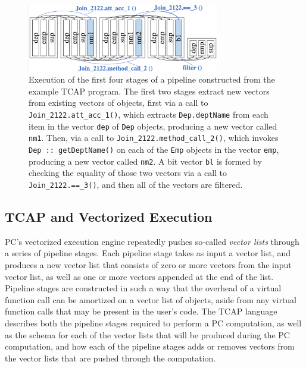 \begin{figure}
  \begin{center}
    \includegraphics[width=3.3in]{TCAP}
  \end{center}
  \caption{Execution of the first four stages of a pipeline constructed from the example TCAP program.  The first two stages extract new vectors from 
existing vectors of objects, first via a call to
\texttt{Join\_2122.att\_acc\_1()}, which extracts
\texttt{Dep.deptName} from each item in the vector \texttt{dep}
of \texttt{Dep} objects, producing a new vector called \texttt{nm1}. Then,
via a call to \texttt{Join\_2122.method\_call\_2()}, which invokes \texttt{Dep :: getDeptName()} on each of the \texttt{Emp} objects
in the vector \texttt{emp}, producing a new vector called \texttt{nm2}.  A bit vector \texttt{bl} is formed by checking the equality of those two 
vectors via a call to \texttt{Join\_2122.==\_3()}, and then all of the vectors are filtered.}
  \label{fig:TCAP}
\end{figure}


\subsection{TCAP and Vectorized Execution} \label{sec:vectorized}

PC's vectorized execution engine repeatedly pushes 
so-called \emph{vector lists} through a series of pipeline stages.  Each pipeline stage
takes as input a vector list,
and produces a 
new vector list that consists of zero or more vectors from the input
vector list, as well as one or more vectors appended at the end of the list.
Pipeline stages are constructed in such a way that the overhead of a
virtual function call can be amortized on a vector list of objects,
aside from any virtual function calls that may be
present 
in the user's code.
The TCAP language describes both the pipeline stages required to perform a PC computation, as well as the schema for each of the vector lists that
will be produced during the PC computation, and how each of the pipeline stages adds or removes vectors from the vector lists that are pushed through
the computation.

